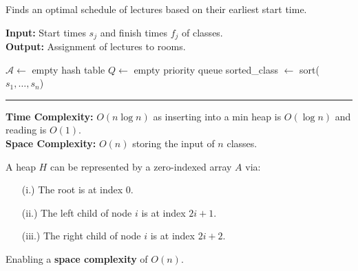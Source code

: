 \begin{Func}[EarliestStartTimeFirst Algorithm - \texttt{EST($j = 1 \dots n : s_j, f_j$)}]
    Finds an optimal schedule of lectures based on their earliest start time.

    \vspace{.5em}
    \noindent
    \textbf{Input:} Start times $s_j$ and finish times $f_j$ of classes.\\
    \textbf{Output:} Assignment of lectures to rooms.\\
    \begin{algorithm}[H]
        \SetAlgoLined
        $\mathcal{A} \gets$ empty hash table 
        $Q \gets$ empty priority queue 
        sorted\_class $\gets$ sort($s_1, \dots, s_n$) 
        
    \end{algorithm}

    \vspace{1em}
    \noindent\rule{\textwidth}{0.4pt}

    \noindent
    \textbf{Time Complexity:} $O(n\log n)$ as inserting into a min heap is $O(\log n)$ and reading is $O(1)$.\\
    \textbf{Space Complexity:} $O(n)$ storing the input of $n$ classes.
\end{Func}

\begin{theo}

    A heap $H$ can be represented by a zero-indexed array $A$ via:
    \begin{itemize}
        \item[(i.)] The root is at index $0$.
        \item[(ii.)] The left child of node $i$ is at index $2i + 1$.
        \item[(iii.)] The right child of node $i$ is at index $2i + 2$.
    \end{itemize}

    \noindent
    Enabling a \textbf{space complexity} of $O(n)$.
\end{theo}
\newpage


